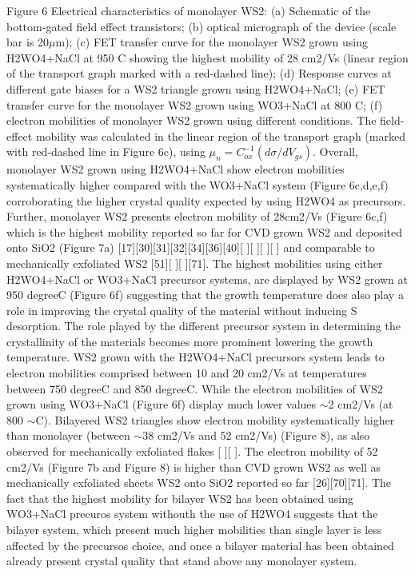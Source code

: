 \documentclass[12pt]{article}
\begin{document}
Figure 6 Electrical characteristics of monolayer WS2: (a) Schematic of the bottom-gated field effect transistors; (b) optical micrograph of the device (scale bar is 20${\mu}$m); (c) FET transfer curve for the monolayer WS2 grown using H2WO4+NaCl at 950 {\degree}C showing the highest mobility of 28 cm2/Vs (linear region of the transport graph marked with a red-dashed line); (d) Response curves at different gate biases for a WS2 triangle grown using H2WO4+NaCl; (e) FET transfer curve for the monolayer WS2 grown using WO3+NaCl at 800 {\degree}C; (f) electron mobilities of monolayer WS2 grown using different conditions. 
The field-effect mobility was calculated in the linear region of the transport graph (marked with red-dashed line in Figure 6c), using ${\mu}_n=C_{ox}^{-1}(d{\sigma}/dV_{gs})$. Overall, monolayer WS2 grown using H2WO4+NaCl show electron mobilities systematically higher compared with the WO3+NaCl system (Figure 6c,d,e,f) corroborating the higher crystal quality expected by using H2WO4 as precursors. Further, monolayer WS2 presents electron mobility of 28cm2/Vs (Figure 6c,f) which is the highest mobility reported so far for CVD grown WS2 and deposited onto SiO2 (Figure 7a) [17][30][31][32][34][36][40][ ][ ][ ][ ] and comparable to mechanically exfoliated WS2 [51][ ][ ][71]. The highest mobilities using either H2WO4+NaCl or WO3+NaCl precursor systems, are displayed by WS2 grown at 950 {degree}C (Figure 6f) suggesting that the growth temperature does also play a role in improving the crystal quality of the material without inducing S desorption. The role played by the different precursor system in determining the crystallinity of the materials becomes more prominent lowering the growth temperature. WS2 grown with the H2WO4+NaCl precursors system leads to electron mobilities comprised between 10 and 20 cm2/Vs at temperatures between 750 {degree}C and 850 {degree}C. While the electron mobilities of WS2 grown using WO3+NaCl  (Figure 6f) display much lower values  {$\sim$}2 cm2/Vs (at 800 $\sim$C).  Bilayered WS2 triangles show electron mobility systematically higher than monolayer (between {$\sim$}38 cm2/Vs and 52 cm2/Vs) (Figure 8), as also observed for mechanically exfoliated flakes [ ][ ]. The electron mobility of 52 cm2/Vs (Figure 7b and Figure 8) is higher than CVD grown WS2 as well as mechanically exfoliated sheets WS2 onto SiO2 reported so far [26][70][71]. The fact that the highest mobility for bilayer WS2 has been obtained using WO3+NaCl precuros system withouth the use of H2WO4 suggests that the bilayer system, which present much higher mobilities than single layer is less affected by the precursos choice, and once a bilayer material has been obtained already present crystal quality that stand above any monolayer system. 
\end{document}
